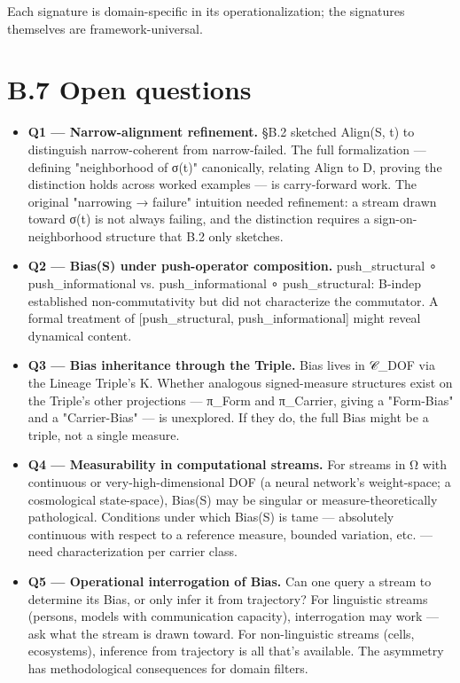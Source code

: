 \documentclass[11pt, openany]{book}
\newcommand{\sectionbreak}{\clearpage}
\begin{document}
Each signature is domain-specific in its operationalization; the signatures themselves are framework-universal.

\sectionbreak

\section{B.7 Open questions}

\begin{itemize}
\item \textbf{Q1 --- Narrow-alignment refinement.} §B.2 sketched Align(S, t) to distinguish narrow-coherent from narrow-failed. The full formalization --- defining "neighborhood of σ(t)" canonically, relating Align to D, proving the distinction holds across worked examples --- is carry-forward work. The original "narrowing → failure" intuition needed refinement: a stream drawn toward σ(t) is not always failing, and the distinction requires a sign-on-neighborhood structure that B.2 only sketches.
\item \textbf{Q2 --- Bias(S) under push-operator composition.} push\_\allowbreak{}structural ∘ push\_\allowbreak{}informational vs. push\_\allowbreak{}informational ∘ push\_\allowbreak{}structural: B-indep established non-commutativity but did not characterize the commutator. A formal treatment of [push\_\allowbreak{}structural, push\_\allowbreak{}informational] might reveal dynamical content.
\item \textbf{Q3 --- Bias inheritance through the Triple.} Bias lives in 𝒞\_\allowbreak{}DOF via the Lineage Triple's Κ. Whether analogous signed-measure structures exist on the Triple's other projections --- π\_\allowbreak{}Form and π\_\allowbreak{}Carrier, giving a "Form-Bias" and a "Carrier-Bias" --- is unexplored. If they do, the full Bias might be a triple, not a single measure.
\item \textbf{Q4 --- Measurability in computational streams.} For streams in Ω with continuous or very-high-dimensional DOF (a neural network's weight-space; a cosmological state-space), Bias(S) may be singular or measure-theoretically pathological. Conditions under which Bias(S) is tame --- absolutely continuous with respect to a reference measure, bounded variation, etc. --- need characterization per carrier class.
\item \textbf{Q5 --- Operational interrogation of Bias.} Can one query a stream to determine its Bias, or only infer it from trajectory? For linguistic streams (persons, models with communication capacity), interrogation may work --- ask what the stream is drawn toward. For non-linguistic streams (cells, ecosystems), inference from trajectory is all that's available. The asymmetry has methodological consequences for domain filters.
\end{itemize}
\end{document}
